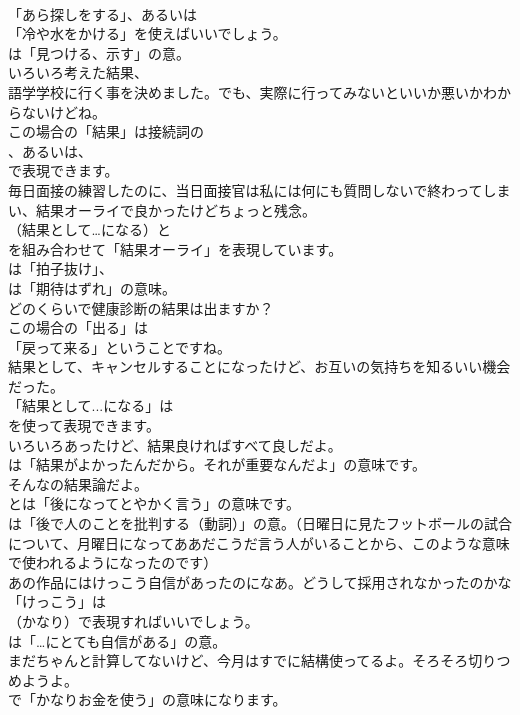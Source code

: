 \documentclass[8pt]{extreport}
\begin{document}
\begin{CJK}{UTF8}{min}
\\	「あら探しをする」、あるいは
\\	「冷や水をかける」を使えばいいでしょう。
\\	は「見つける、示す」の意。	
\\	いろいろ考えた結果、
\\	語学学校に行く事を決めました。でも、実際に行ってみないといいか悪いかわからないけどね。 
\\	この場合の「結果」は接続詞の
\\	、あるいは、
\\	で表現できます。	
\\	毎日面接の練習したのに、当日面接官は私には何にも質問しないで終わってしまい、結果オーライで良かったけどちょっと残念。 
\\	（結果として…になる）と 
\\	を組み合わせて「結果オーライ」を表現しています。
\\	は「拍子抜け」、
\\	は「期待はずれ」の意味。	
\\	どのくらいで健康診断の結果は出ますか？ 
\\	この場合の「出る」は
\\	「戻って来る」ということですね。	
\\	結果として、キャンセルすることになったけど、お互いの気持ちを知るいい機会だった。 
\\	「結果として...になる」は
\\	を使って表現できます。	
\\	いろいろあったけど、結果良ければすべて良しだよ。 
\\	は「結果がよかったんだから。それが重要なんだよ」の意味です。	
\\	そんなの結果論だよ。 
\\	とは「後になってとやかく言う」の意味です。
\\	は「後で人のことを批判する（動詞）」の意。（日曜日に見たフットボールの試合について、月曜日になってああだこうだ言う人がいることから、このような意味で使われるようになったのです）	
\\	あの作品にはけっこう自信があったのになあ。どうして採用されなかったのかな 
\\	「けっこう」は
\\	（かなり）で表現すればいいでしょう。
\\	は「…にとても自信がある」の意。	
\\	まだちゃんと計算してないけど、今月はすでに結構使ってるよ。そろそろ切りつめようよ。 
\\	で「かなりお金を使う」の意味になります。

\end{CJK}
\end{document}

